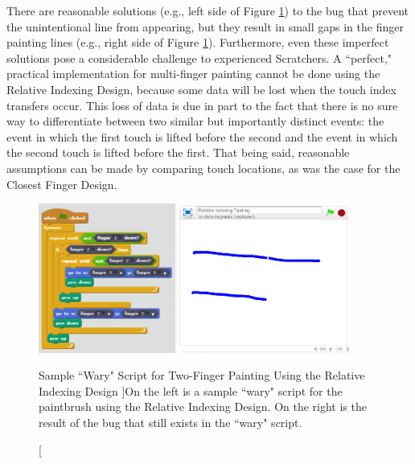 There are reasonable solutions (e.g., left side of Figure \ref{WaryTwoFingerPaintingRID}) to the bug that prevent the unintentional line from appearing, but they result in small gaps in the finger painting lines (e.g., right side of Figure \ref{WaryTwoFingerPaintingRID}). Furthermore, even these imperfect solutions pose a considerable challenge to experienced Scratchers. A ``perfect," practical implementation for multi-finger painting cannot be done using the Relative Indexing Design, because some data will be lost when the touch index transfers occur. This loss of data is due in part to the fact that there is no sure way to differentiate between two similar but importantly distinct events: the event in which the first touch is lifted before the second and the event in which the second touch is lifted before the first. That being said, reasonable assumptions can be made by comparing touch locations, as was the case for the Closest Finger Design. 

\begin{figure}
\centering
\includegraphics[width=0.4\textwidth]{images/WaryTwoFingerPaintingRID.PNG}
\includegraphics[width=0.5\textwidth]{images/IndexTransferGapBug.PNG}
\caption[Sample ``Wary" Script for Two-Finger Painting Using the Relative Indexing Design ]{On the left is a sample ``wary" script for the paintbrush using the Relative Indexing Design. On the right is the result of the bug that still exists in the ``wary" script.}
\label{WaryTwoFingerPaintingRID}
\end{figure}

